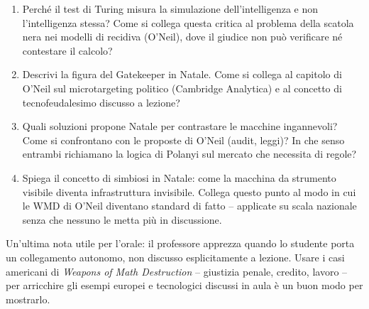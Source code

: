\documentclass[a4paper,11pt]{article}
\begin{document}
\begin{enumerate}
  \item Perché il test di Turing misura la simulazione dell'intelligenza e non l'intelligenza stessa? Come si collega questa critica al problema della scatola nera nei modelli di recidiva (O'Neil), dove il giudice non può verificare né contestare il calcolo?
  \item Descrivi la figura del Gatekeeper in Natale. Come si collega al capitolo di O'Neil sul microtargeting politico (Cambridge Analytica) e al concetto di tecnofeudalesimo discusso a lezione?
  \item Quali soluzioni propone Natale per contrastare le macchine ingannevoli? Come si confrontano con le proposte di O'Neil (audit, leggi)? In che senso entrambi richiamano la logica di Polanyi sul mercato che necessita di regole?
  \item Spiega il concetto di simbiosi in Natale: come la macchina da strumento visibile diventa infrastruttura invisibile. Collega questo punto al modo in cui le WMD di O'Neil diventano standard di fatto -- applicate su scala nazionale senza che nessuno le metta più in discussione.
\end{enumerate}

Un'ultima nota utile per l'orale: il professore apprezza quando lo studente porta un collegamento autonomo, non discusso esplicitamente a lezione. Usare i casi americani di \emph{Weapons of Math Destruction} -- giustizia penale, credito, lavoro -- per arricchire gli esempi europei e tecnologici discussi in aula è un buon modo per mostrarlo.
\end{document}
